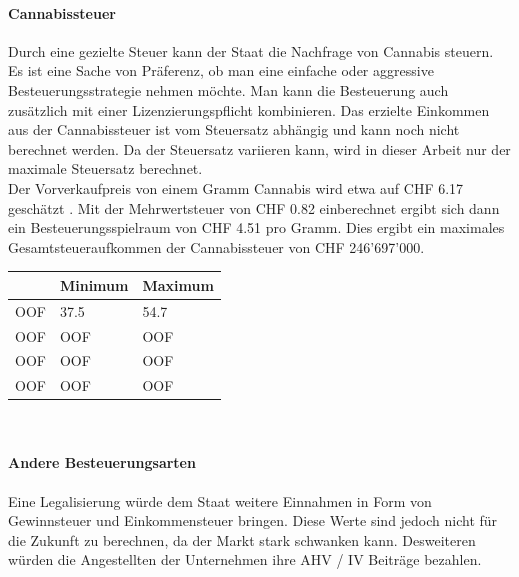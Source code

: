 \documentclass[../main.tex]{subfiles}
\begin{document}
	 \paragraph{Cannabissteuer}
	 Durch eine gezielte Steuer kann der Staat die Nachfrage von Cannabis steuern. 
	 Es ist eine Sache von Präferenz, ob man eine einfache oder aggressive Besteuerungsstrategie nehmen möchte.
	 Man kann die Besteuerung auch zusätzlich mit einer Lizenzierungspflicht kombinieren.
	 Das erzielte Einkommen aus der Cannabissteuer ist vom Steuersatz abhängig und kann noch nicht berechnet werden.
	 Da der Steuersatz variieren kann, wird in dieser Arbeit nur der maximale Steuersatz berechnet.\\
	 
	 \noindent
	 Der Vorverkaufpreis von einem Gramm Cannabis wird etwa auf CHF 6.17 geschätzt \cite{bandli}.
	 Mit der Mehrwertsteuer von CHF 0.82 einberechnet ergibt sich dann ein Besteuerungsspielraum von CHF 4.51 pro Gramm.
	 Dies ergibt ein maximales Gesamtsteueraufkommen der Cannabissteuer von CHF 246'697'000.
	 
	 \noindent
	 \begin{tabularx}{\textwidth}{X X X}
     	\toprule
     	\phantom{x} & Minimum & Maximum \\
        \midrule
        OOF & 37.5 & 54.7\\
        \midrule
        OOF & OOF & OOF\\
        \midrule
        OOF & OOF & OOF\\
        \midrule
        OOF & OOF & OOF\\
        \bottomrule
     \end{tabularx}\\
	 
	 \paragraph{Andere Besteuerungsarten}
	 Eine Legalisierung würde dem Staat weitere Einnahmen in Form von Gewinnsteuer und Einkommensteuer bringen.
	 Diese Werte sind jedoch nicht für die Zukunft zu berechnen, da der Markt stark schwanken kann.
	 Desweiteren würden die Angestellten der Unternehmen ihre AHV / IV Beiträge bezahlen.
	 
	 
	 
	 
	 
\end{document}
